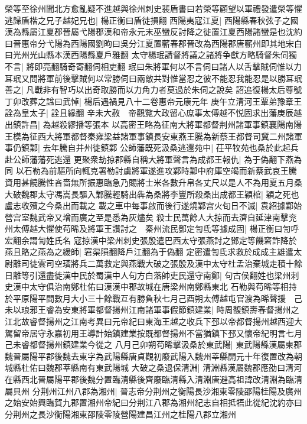 榮等至徐州聞北方愈亂疑不進越與徐州刺史裴盾書曰若榮等顧望以軍禮發遣榮等懼逃歸盾楷之兄子越妃兄也|{
	楊正衡曰盾徒損翻}
西陽夷寇江夏|{
	西陽縣春秋弦子之國漢為縣屬江夏郡晉屬弋陽郡漢和帝永元末巫蠻反討降之徙置江夏西陽諸蠻是也沈約曰晉惠帝分弋陽為西陽國劉昫曰吳分江夏置蘄春郡晉改為西陽郡唐蘄州即其地宋白曰光州光山縣本漢西陽縣夏戶雅翻}
太守楊珉請督將議之諸將争獻方略騎督朱伺獨不言|{
	將即亮翻騎奇寄翻伺相吏翻}
珉曰朱將軍何以不言伺曰諸人以舌擊賊伺惟以力耳珉又問將軍前後擊賊何以常勝伺曰兩敵共對惟當忍之彼不能忍我能忍是以勝耳珉善之|{
	凡戰非有智巧以出奇取勝而以力角力者莫過於朱伺之說矣}
詔追復楊太后尊號丁卯改葬之諡曰武悼|{
	楊后遇禍見八十二卷惠帝元康元年}
庚午立清河王覃弟豫章王詮為皇太子|{
	詮且緣翻}
辛未大赦　帝觀覧大政留心庶事太傅越不悦固求出藩庚辰越出鎮許昌|{
	為越殺繆播等張本}
以高密王略為征南大將軍都督荆州諸軍事鎮襄陽南陽王模為征西大將軍都督秦雍梁益諸軍事鎮長安東燕王騰為新蔡王都督司冀二州諸軍事仍鎮鄴|{
	去年騰自并州徙鎮鄴}
公師藩既死汲桑逃還苑中|{
	茌平牧苑也桑於此起兵赴公師藩藩死逃還}
更聚衆劫掠郡縣自稱大將軍聲言為成都王報仇|{
	為于偽翻下燕為同}
以石勒為前驅所向輒克署勒討虜將軍遂進攻鄴時鄴中府庫空竭而新蔡武哀王騰資用甚饒騰性吝嗇無所振惠臨急乃賜將士米各數升帛各丈尺以是人不為用夏五月桑大破魏郡太守馮嵩長驅入鄴騰輕騎出犇為桑將李豐所殺桑出成都王穎棺|{
	穎之死也盧志收殯之今桑出而載之}
載之車中每事啟而後行遂燒鄴宫火旬日不滅|{
	袁紹據鄴始營宫室魏武帝又增而廣之至是悉為灰燼矣}
殺士民萬餘人大掠而去濟自延津南擊兖州太傅越大懼使苟晞及將軍王讚討之　秦州流民鄧定訇氐等據成固|{
	楊正衡曰訇呼宏翻余謂訇姓氏名}
寇掠漢中梁州刺史張殷遣巴西太守張燕討之鄧定等饑窘詐降於燕且賂之燕為之緩師|{
	窘渠隕翻降戶江翻為于偽翻}
定密遣訇氐求救於成成主雄遣太尉離司徒雲司空璜將兵二萬救定與燕戰大破之張殷及漢中太守杜孟治棄城走積十餘日離等引還盡徙漢中民於蜀漢中人句方白落帥吏民還守南鄭|{
	句古侯翻姓也梁州刺史漢中太守俱治南鄭杜佑曰漢漢中郡故城在唐梁州南鄭縣東北}
石勒與苟晞等相持於平原陽平間數月大小三十餘戰互有勝負秋七月己酉朔太傅越屯官渡為晞聲援　己未以琅邪王睿為安東將軍都督揚州江南諸軍事假節鎮建業|{
	時周馥鎮壽春督揚州之江北故睿督揚州之江南考異曰元帝紀曰東海王越之收兵下邳以帝都督揚州越西迎大駕留帝居守永嘉初用王導計始鎮建業按既都督揚州不當猶鎮下邳又懷帝紀明言七月己未睿都督揚州鎮建業今從之}
八月己卯朔苟晞擊汲桑於東武陽|{
	東武陽縣漢屬柬郡魏晉屬陽平郡後魏去東字為武陽縣唐貞觀初廢武陽入魏州莘縣開元十年復置改為朝城縣杜佑曰魏郡莘縣南有東武陽城}
大破之桑退保清淵|{
	清淵縣漢屬魏郡應劭曰清河在縣西北晉屬陽平郡後魏分置臨清縣後齊廢臨清縣入清淵唐避高祖諱改清淵為臨清屬貝州}
分荆州江州八郡為湘州|{
	晉志帝分荆州之衡陽長沙湘東零陵邵陽桂陽及廣州之始安始興臨賀九郡置湘州帝紀曰分荆江八郡為湘州紀志自相抵牾此從紀沈約亦曰分荆州之長沙衡陽湘東邵陵零陵營陽建昌江州之桂陽八郡立湘州}
